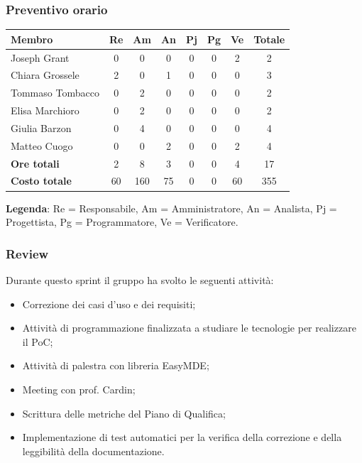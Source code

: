 \documentclass[11pt,a4paper]{article}
\begin{document}
\subsubsection{Preventivo orario}
\begin{center}
    \begin{tabular}{|l|c|c|c|c|c|c|c|}
        \hline
        \textbf{Membro} & \textbf{Re} & \textbf{Am} & \textbf{An} & \textbf{Pj} & \textbf{Pg} & \textbf{Ve} & \textbf{Totale} \\
        \hline
        Joseph Grant & 0 & 0 & 0 & 0 & 0 & 2 & 2 \\
        \hline
        Chiara Grossele & 2 & 0 & 1 & 0 & 0 & 0 & 3 \\
        \hline
        Tommaso Tombacco & 0 & 2 & 0 & 0 & 0 & 0 & 2 \\
        \hline
        Elisa Marchioro & 0 & 2 & 0 & 0 & 0 & 0 & 2 \\
        \hline
        Giulia Barzon & 0 & 4 & 0 & 0 & 0 & 0 & 4 \\
        \hline
        Matteo Cuogo & 0 & 0 & 2 & 0 & 0 & 2 & 4 \\
        \hline
        \textbf{Ore totali} & 2 & 8 & 3 & 0 & 0 & 4 & 17 \\
        \hline
        \textbf{Costo totale} & 60 & 160 & 75 & 0 & 0 & 60 & 355 \\
        \hline
    \end{tabular}
\end{center}

\noindent \textbf{Legenda}: Re = Responsabile, Am = Amministratore, An = Analista, Pj = Progettista, Pg = Programmatore, Ve = Verificatore.

\subsubsection{Review}
Durante questo sprint il gruppo ha svolto le seguenti attività:

\begin{itemize}
        \item Correzione dei casi d'uso e dei requisiti;
        \item Attività di programmazione finalizzata a studiare le tecnologie per realizzare il PoC;
        \item Attività di palestra con libreria EasyMDE;
        \item Meeting con prof. Cardin;
        \item Scrittura delle metriche del Piano di Qualifica;
        \item Implementazione di test automatici per la verifica della correzione e della leggibilità della documentazione.
    \end{itemize}
\end{document}
